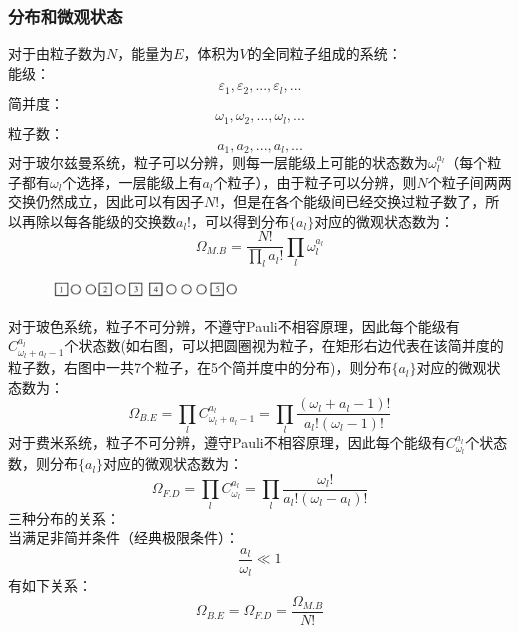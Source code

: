 \documentclass[12pt]{article}
\begin{document}
\subsubsection{分布和微观状态}
对于由粒子数为$N$，能量为$E$，体积为$V$的全同粒子组成的系统：\\
能级：
\[\varepsilon_1, \varepsilon_2, ..., \varepsilon_l,...\]
简并度：
\[\omega_1, \omega_2,..., \omega_l,...\]
粒子数：
\[a_1, a_2,..., a_l,...\]
对于玻尔兹曼系统，粒子可以分辨，则每一层能级上可能的状态数为$\omega_l^{a_l}$（每个粒子都有$\omega_l$个选择，一层能级上有$a_l$个粒子），由于粒子可以分辨，则$N$个粒子间两两交换仍然成立，因此可以有因子$N!$，但是在各个能级间已经交换过粒子数了，所以再除以每各能级的交换数$a_l!$，可以得到分布$\{a_l\}$对应的微观状态数为：
\begin{equation}
	\Omega_{M.B}=\frac{N!}{\prod\limits_{l}{{{a}_{l}}!}}\prod_{l} \omega_l^{a_l}
	\label{x25}
\end{equation}
\begin{figure}
	\begin{center}
		\includegraphics[width=2in]{F14.png}
		\label{F14}
	\end{center}
\end{figure}
对于玻色系统，粒子不可分辨，不遵守Pauli不相容原理，因此每个能级有$C_{\omega_l+a_l-1}^{a_l}$个状态数(如右图，可以把圆圈视为粒子，在矩形右边代表在该简并度的粒子数，右图中一共7个粒子，在5个简并度中的分布)，则分布$\{a_l\}$对应的微观状态数为：
\begin{equation}
	\Omega_{B.E}=\prod_{l}C_{\omega_l+a_l-1}^{a_l}=\prod_{l} \frac{(\omega_l+a_l-1)!}{a_l! (\omega_l-1)!}
	\label{x32}
\end{equation}
对于费米系统，粒子不可分辨，遵守Pauli不相容原理，因此每个能级有$C_{\omega_l}^{a_l}$个状态数，则分布$\{a_l\}$对应的微观状态数为：
\begin{equation}
	\Omega_{F.D}=\prod_{l} C_{\omega_l}^{a_l}=\prod_{l}\frac{\omega_l!}{a_l!(\omega_l-a_l)!}
	\label{x33}
\end{equation}
三种分布的关系：\\
当满足非简并条件（经典极限条件）：	
	\begin{equation}
		\frac{a_l}{\omega_l}\ll 1
	\end{equation}
有如下关系：
\begin{equation}
	\Omega_{B.E}=\Omega_{F.D}=\frac{\Omega_{M.B}}{N!}
\end{equation}
	\newpage
\end{document}
